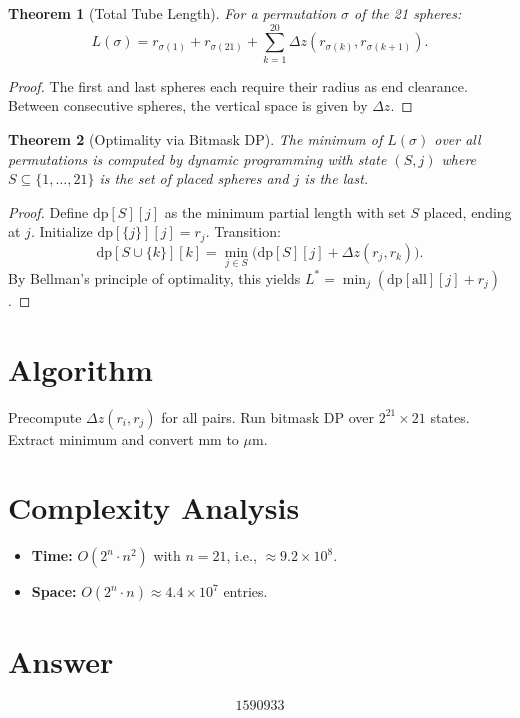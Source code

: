 \documentclass[12pt]{article}
\newtheorem{theorem}{Theorem}
\begin{document}
\begin{theorem}[Total Tube Length]
For a permutation $\sigma$ of the 21 spheres:
\[
L(\sigma) = r_{\sigma(1)} + r_{\sigma(21)} + \sum_{k=1}^{20} \Delta z(r_{\sigma(k)}, r_{\sigma(k+1)}).
\]
\end{theorem}
\begin{proof}
The first and last spheres each require their radius as end clearance. Between consecutive spheres, the vertical space is given by $\Delta z$.
\end{proof}

\begin{theorem}[Optimality via Bitmask DP]
The minimum of $L(\sigma)$ over all permutations is computed by dynamic programming with state $(S, j)$ where $S \subseteq \{1,\ldots,21\}$ is the set of placed spheres and $j$ is the last.
\end{theorem}
\begin{proof}
Define $\mathrm{dp}[S][j]$ as the minimum partial length with set $S$ placed, ending at $j$. Initialize $\mathrm{dp}[\{j\}][j] = r_j$. Transition:
\[
\mathrm{dp}[S \cup \{k\}][k] = \min_{j \in S}\bigl(\mathrm{dp}[S][j] + \Delta z(r_j, r_k)\bigr).
\]
By Bellman's principle of optimality, this yields $L^* = \min_j(\mathrm{dp}[\text{all}][j] + r_j)$.
\end{proof}

\section{Algorithm}
Precompute $\Delta z(r_i, r_j)$ for all pairs. Run bitmask DP over $2^{21} \times 21$ states. Extract minimum and convert mm to $\mu$m.

\section{Complexity Analysis}
\begin{itemize}
\item \textbf{Time:} $O(2^n \cdot n^2)$ with $n = 21$, i.e., $\approx 9.2 \times 10^8$.
\item \textbf{Space:} $O(2^n \cdot n) \approx 4.4 \times 10^7$ entries.
\end{itemize}

\section{Answer}

\[
\boxed{1590933}
\]
\end{document}
